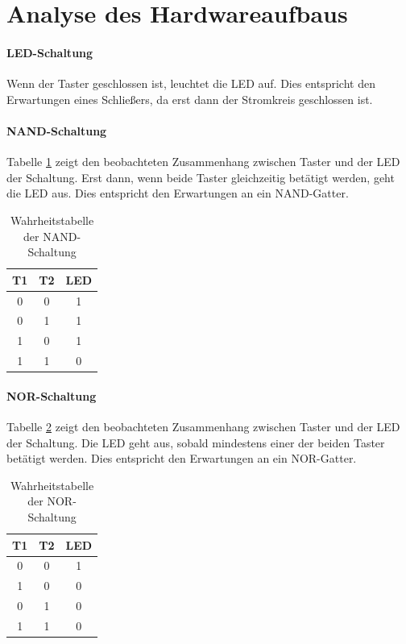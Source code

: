 \documentclass[
    paper=a4,
]{scrartcl}
\begin{document}
\section{Analyse des Hardwareaufbaus}
    \paragraph{LED-Schaltung} Wenn der Taster geschlossen ist, leuchtet die LED auf. Dies entspricht den Erwartungen eines Schließers, da erst dann der Stromkreis geschlossen ist.

    \paragraph{NAND-Schaltung} Tabelle \ref{tab:1} zeigt den beobachteten Zusammenhang zwischen Taster und der LED der Schaltung. Erst dann, wenn beide Taster gleichzeitig betätigt werden, geht die LED aus. Dies entspricht den Erwartungen an ein NAND-Gatter.

    \begin{table}[H]
        \centering
        \caption{Wahrheitstabelle der NAND-Schaltung}
        \label{tab:1}
        \begin{tabular}{cc|c}\toprule
            T1  &   T2  &   LED\\\midrule
            0   &   0   &   1\\
            0   &   1   &   1\\
            1   &   0   &   1\\
            1   &   1   &   0\\\bottomrule
        \end{tabular}
    \end{table}

    \paragraph{NOR-Schaltung} Tabelle \ref{tab:2} zeigt den beobachteten Zusammenhang zwischen Taster und der LED der Schaltung. Die LED geht aus, sobald mindestens einer der beiden Taster betätigt werden. Dies entspricht den Erwartungen an ein NOR-Gatter.

    \begin{table}[h]
        \centering
        \caption{Wahrheitstabelle der NOR-Schaltung}
        \label{tab:2}
        \begin{tabular}{cc|c}\toprule
            T1  &   T2  &   LED\\\midrule
            0   &   0   &   1\\
            1   &   0   &   0\\
            0   &   1   &   0\\
            1   &   1   &   0\\\bottomrule
        \end{tabular}
    \end{table}
\end{document}
